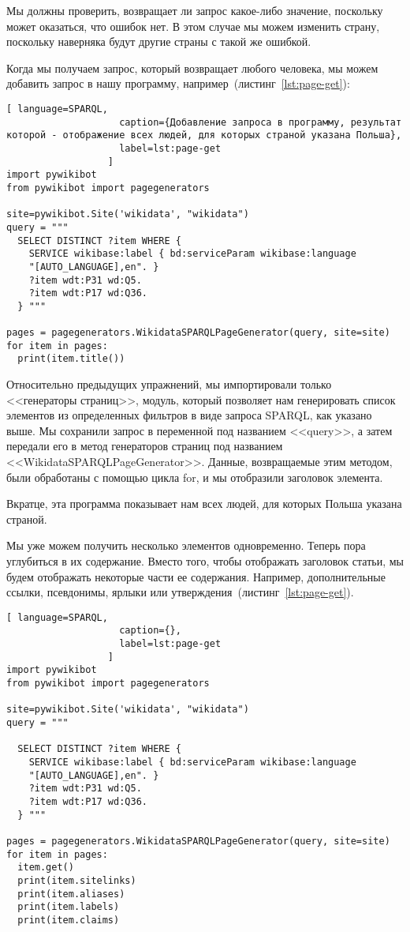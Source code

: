 Мы должны проверить, возвращает ли запрос какое-либо значение, поскольку может оказаться, что ошибок нет. В этом случае мы можем изменить страну, поскольку наверняка будут другие страны с такой же ошибкой.

Когда мы получаем запрос, который возвращает любого человека, мы можем добавить запрос в нашу программу, например~(листинг~\ref{lst:page-get}):

\begin{lstlisting}[ language=SPARQL,
                    caption={Добавление запроса в программу, результат которой - отображение всех людей, для которых страной указана Польша},
                    label=lst:page-get
                  ]
import pywikibot
from pywikibot import pagegenerators

site=pywikibot.Site('wikidata', "wikidata")
query = """
  SELECT DISTINCT ?item WHERE {
    SERVICE wikibase:label { bd:serviceParam wikibase:language 
    "[AUTO_LANGUAGE],en". }
    ?item wdt:P31 wd:Q5.
    ?item wdt:P17 wd:Q36.
  } """

pages = pagegenerators.WikidataSPARQLPageGenerator(query, site=site)
for item in pages:
  print(item.title())
\end{lstlisting}    

Относительно предыдущих упражнений, мы импортировали только <<генераторы страниц>>, модуль, который позволяет нам генерировать список элементов из определенных фильтров в виде запроса SPARQL, как указано выше. Мы сохранили запрос в переменной под названием <<query>>, а затем передали его в метод генераторов страниц под названием <<WikidataSPARQLPageGenerator>>. Данные, возвращаемые этим методом, были обработаны с помощью цикла for, и мы отобразили заголовок элемента.

Вкратце, эта программа показывает нам всех людей, для которых Польша указана страной.

Мы уже можем получить несколько элементов одновременно. Теперь пора углубиться в их содержание. Вместо того, чтобы отображать заголовок статьи, мы будем отображать некоторые части ее содержания. Например, дополнительные ссылки, псевдонимы, ярлыки или утверждения~(листинг~\ref{lst:page-get}).

\begin{lstlisting}[ language=SPARQL,
                    caption={},
                    label=lst:page-get
                  ]
import pywikibot
from pywikibot import pagegenerators

site=pywikibot.Site('wikidata', "wikidata")
query = """

  SELECT DISTINCT ?item WHERE {
    SERVICE wikibase:label { bd:serviceParam wikibase:language 
    "[AUTO_LANGUAGE],en". }
    ?item wdt:P31 wd:Q5.
    ?item wdt:P17 wd:Q36.
  } """

pages = pagegenerators.WikidataSPARQLPageGenerator(query, site=site)
for item in pages:
  item.get()
  print(item.sitelinks)
  print(item.aliases)
  print(item.labels)
  print(item.claims)
\end{lstlisting} 

